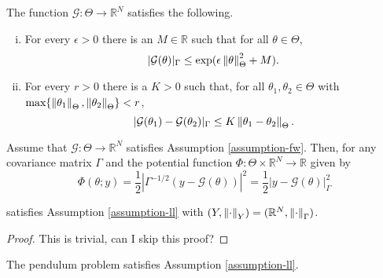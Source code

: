 \begin{assumption}\label{assumption-fw}
  The function $\mathcal{G} : \Theta \rightarrow \mathbb{R}^N$ satisfies the following.

  \begin{enumerate}[i)]
  \item For every $\epsilon > 0$ there is an $M \in \mathbb{R}$ such that for all $\theta \in \Theta$,
    \begin{equation*}
      |\mathcal{G}(\theta)|_\Gamma \le \exp(\epsilon \left\lVert\theta\right\rVert_\Theta^2 + M).
    \end{equation*}
  \item For every $r > 0$ there is a $K > 0$ such that, for all $\theta_1, \theta_2 \in \Theta$ with $\text{max}\{\left\lVert\theta_1\right\rVert_\Theta, \left\lVert\theta_2\right\rVert_\Theta\} < r$,
    \begin{equation*}
      |\mathcal{G}(\theta_1) - \mathcal{G}(\theta_2)|_\Gamma \le K\left\lVert\theta_1 - \theta_2\right\rVert_\Theta.
    \end{equation*}
  \end{enumerate}
\end{assumption}

\begin{lemma} \label{fw-implies-ll}
  Assume that $\mathcal{G} : \Theta \rightarrow \mathbb{R}^N$ satisfies Assumption \ref{assumption-fw}. Then, for any covariance matrix $\Gamma$ and the potential function $\Phi : \Theta \times \mathbb{R}^N \rightarrow \mathbb{R}$ given by
  \begin{equation*}
    \Phi(\theta; y) = \frac12 \left|\Gamma^{-1/2}(y - \mathcal{G}(\theta))\right|^2 = \frac12 \left|y - \mathcal{G}(\theta)\right|^2_\Gamma
  \end{equation*}

  satisfies Assumption \ref{assumption-ll} with $(Y, \left\lVert\cdot\right\rVert_Y) = (\mathbb{R}^N, \left\lVert\cdot\right\rVert_\Gamma)$.
\end{lemma}

\begin{proof} This is trivial, can I skip this proof?
\end{proof}

\begin{lemma} The pendulum problem satisfies Assumption \ref{assumption-ll}.
\end{lemma}

